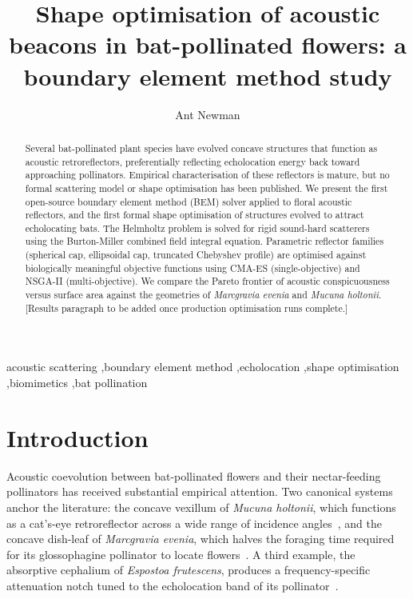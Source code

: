 \documentclass[preprint,12pt]{elsarticle}
\begin{document}
\begin{frontmatter}

\title{Shape optimisation of acoustic beacons in bat-pollinated flowers: a boundary element method study}

\author[1]{Ant Newman}

\begin{abstract}
Several bat-pollinated plant species have evolved concave structures that function as acoustic retroreflectors, preferentially reflecting echolocation energy back toward approaching pollinators. Empirical characterisation of these reflectors is mature, but no formal scattering model or shape optimisation has been published. We present the first open-source boundary element method (BEM) solver applied to floral acoustic reflectors, and the first formal shape optimisation of structures evolved to attract echolocating bats. The Helmholtz problem is solved for rigid sound-hard scatterers using the Burton-Miller combined field integral equation. Parametric reflector families (spherical cap, ellipsoidal cap, truncated Chebyshev profile) are optimised against biologically meaningful objective functions using CMA-ES (single-objective) and NSGA-II (multi-objective). We compare the Pareto frontier of acoustic conspicuousness versus surface area against the geometries of \textit{Marcgravia evenia} and \textit{Mucuna holtonii}. [Results paragraph to be added once production optimisation runs complete.]
\end{abstract}

\begin{keyword}
acoustic scattering \sep boundary element method \sep echolocation \sep shape optimisation \sep biomimetics \sep bat pollination
\end{keyword}

\end{frontmatter}

\section{Introduction}
\label{sec:introduction}

Acoustic coevolution between bat-pollinated flowers and their nectar-feeding pollinators has received substantial empirical attention. Two canonical systems anchor the literature: the concave vexillum of \textit{Mucuna holtonii}, which functions as a cat's-eye retroreflector across a wide range of incidence angles~\cite{vonHelversen1999,vonHelversen2003jcp}, and the concave dish-leaf of \textit{Marcgravia evenia}, which halves the foraging time required for its glossophagine pollinator to locate flowers~\cite{Simon2011}. A third example, the absorptive cephalium of \textit{Espostoa frutescens}, produces a frequency-specific attenuation notch tuned to the echolocation band of its pollinator~\cite{Simon2023}.
\end{document}
